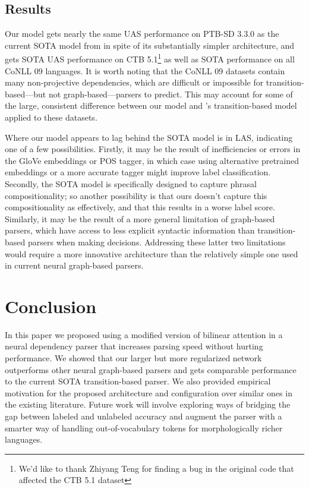\documentclass[11pt,a4paper]{article}
\begin{document}
\subsection{Results}
Our model gets nearly the same UAS performance on PTB-SD 3.3.0 as the current SOTA model from \citet{KuncoroBallesterosetal2016} in spite of its substantially simpler architecture, and gets SOTA UAS performance on CTB 5.1\footnote{We'd like to thank Zhiyang Teng for finding a bug in the original code that affected the CTB 5.1 dataset} as well as SOTA performance on all CoNLL 09 languages. It is worth noting that the CoNLL 09 datasets contain many non-projective dependencies, which are difficult or impossible for transition-based---but not graph-based---parsers to predict. This may account for some of the large, consistent difference between our model and \citeauthor{Andoretal2016}'s \citeyear{Andoretal2016} transition-based model applied to these datasets.

Where our model appears to lag behind the SOTA model is in LAS, indicating one of a few possibilities. Firstly, it may be the result of inefficiencies or errors in the GloVe embeddings or POS tagger, in which case using alternative pretrained embeddings or a more accurate tagger might improve label classification. Secondly, the SOTA model is specifically designed to capture phrasal compositionality; so another possibility is that ours doesn't capture this compositionality as effectively, and that this results in a worse label score. Similarly, it may be the result of a more general limitation of graph-based parsers, which have access to less explicit syntactic information than transition-based parsers when making decisions. Addressing these latter two limitations would require a more innovative architecture than the relatively simple one used in current neural graph-based parsers.

\section{Conclusion}
In this paper we proposed using a modified version of bilinear attention in a neural dependency parser that increases parsing speed without hurting performance. We showed that our larger but more regularized network outperforms other neural graph-based parsers and gets comparable performance to the current SOTA transition-based parser. We also provided empirical motivation for the proposed architecture and configuration over similar ones in the existing literature. Future work will involve exploring ways of bridging the gap between labeled and unlabeled accuracy and augment the parser with a smarter way of handling out-of-vocabulary tokens for morphologically richer languages.


\end{document}
